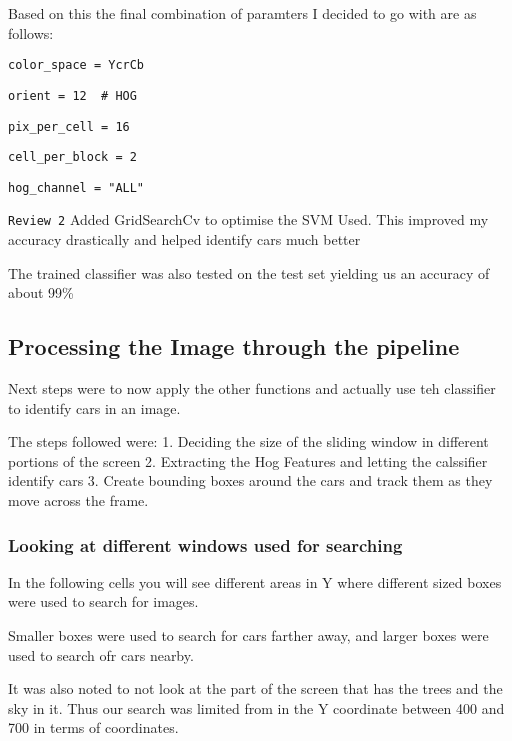\documentclass[11pt]{article}
\begin{document}
Based on this the final combination of paramters I decided to go with
are as follows:

\texttt{color\_space\ =\ \textquotesingle{}YcrCb\textquotesingle{}}

\texttt{orient\ =\ 12\ \ \#\ HOG}

\texttt{pix\_per\_cell\ =\ 16}

\texttt{cell\_per\_block\ =\ 2}

\texttt{hog\_channel\ =\ "ALL"}

\texttt{Review\ 2} Added GridSearchCv to optimise the SVM Used. This
improved my accuracy drastically and helped identify cars much better

    The trained classifier was also tested on the test set yielding us an
accuracy of about 99\%

    \hypertarget{processing-the-image-through-the-pipeline}{%
\subsection{Processing the Image through the
pipeline}\label{processing-the-image-through-the-pipeline}}

Next steps were to now apply the other functions and actually use teh
classifier to identify cars in an image.

The steps followed were: 1. Deciding the size of the sliding window in
different portions of the screen 2. Extracting the Hog Features and
letting the calssifier identify cars 3. Create bounding boxes around the
cars and track them as they move across the frame.

    \hypertarget{looking-at-different-windows-used-for-searching}{%
\subsubsection{Looking at different windows used for
searching}\label{looking-at-different-windows-used-for-searching}}

    In the following cells you will see different areas in Y where different
sized boxes were used to search for images.

Smaller boxes were used to search for cars farther away, and larger
boxes were used to search ofr cars nearby.

It was also noted to not look at the part of the screen that has the
trees and the sky in it. Thus our search was limited from in the Y
coordinate between 400 and 700 in terms of coordinates.
\end{document}
